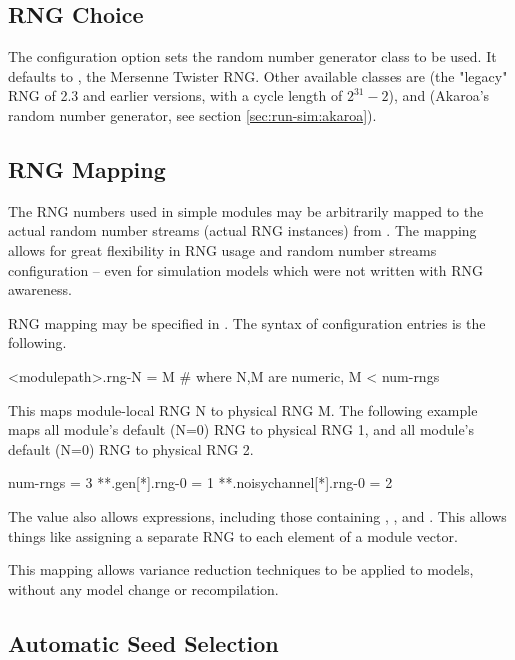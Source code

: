\subsection{RNG Choice}
\label{sec:config-sim:rng-choice}

The  configuration option sets the random number
generator class to be used. It defaults to ,
the Mersenne Twister RNG. Other available classes are 
(the "legacy" RNG of {\opp} 2.3 and earlier versions, with a cycle length
of $2^{31}-2$), and  (Akaroa's random number generator,
see section \ref{sec:run-sim:akaroa}).

\subsection{RNG Mapping}
\label{sec:config-sim:rng-mapping}

The RNG numbers used in simple modules may be arbitrarily mapped to the
actual random number streams (actual RNG instances) from .
The mapping allows for great flexibility in RNG usage and random number
streams configuration -- even for simulation models which were not
written with RNG awareness.

RNG mapping may be specified in . The syntax of
configuration entries is the following.

\begin{inifile}
[General]
<modulepath>.rng-N = M  # where N,M are numeric, M < num-rngs
\end{inifile}

This maps module-local RNG N to physical RNG M. The following
example maps all  module's default (N=0) RNG to physical RNG 1,
and all  module's default (N=0) RNG to physical RNG 2.

\begin{inifile}
[General]
num-rngs = 3
**.gen[*].rng-0 = 1
**.noisychannel[*].rng-0 = 2
\end{inifile}

The value also allows expressions, including those containing ,
, and . This allows things
like assigning a separate RNG to each element of a module vector.

This mapping allows variance reduction techniques to be applied to
{\opp} models, without any model change or recompilation.


\subsection{Automatic Seed Selection}
\label{sec:config-sim:automatic-seed-selection}


